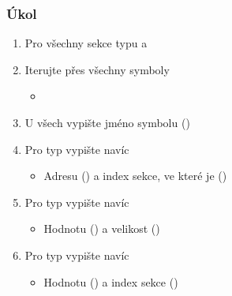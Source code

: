 \begin{frame}
  \frametitle{Úkol}

  \begin{enumerate}
    \item Pro všechny sekce typu  a 
    \item Iterujte přes všechny symboly
    \begin{itemize}
      \item {}
    \end{itemize}

    \item U všech vypište jméno symbolu ()
    \item Pro typ  vypište navíc
    \begin{itemize}
      \item Adresu () a index sekce, ve které je
	()
    \end{itemize}

    \item Pro typ  vypište navíc
    \begin{itemize}
      \item Hodnotu () a velikost ()
    \end{itemize}

    \item Pro typ  vypište navíc
    \begin{itemize}
      \item Hodnotu () a index sekce ()
    \end{itemize}
  \end{enumerate}

\end{frame}

